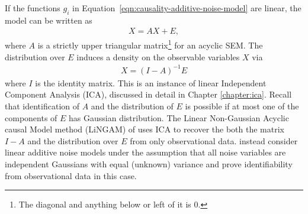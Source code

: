 If the functions $g_i$ in Equation~\ref{eqn:causality-additive-noise-model} are linear, the model can be written as
%
\begin{align}\label{eqn:causality-linear-additive-noise-model}
X = AX + E,
\end{align}
%
where $A$ is a strictly upper triangular matrix\footnote{The diagonal and anything below or left of it is 0.} for an acyclic SEM. 
The distribution over $E$ induces a density on the observable variables $X$ via
%
\begin{align*}
X = (I-A)^{-1} E
\end{align*}
%
where $I$ is the identity matrix. 
This is an instance of linear Independent Component Analysis (ICA), discussed in detail in Chapter \ref{chapter:ica}.%
Recall that identification of $A$ and the distribution of $E$ is possible if at most one of the components of $E$ has Gaussian distribution.
The Linear Non-Gaussian Acyclic causal Model method (LiNGAM) of \cite{shimizu2006linear} uses ICA to recover the both the matrix $I-A$ and the distribution over $E$ from only observational data.
\cite{peters2013identifiability} instead consider linear additive noise models under the assumption that all noise variables are independent Gaussians with equal (unknown) variance and prove identifiability from observational data in this case. 


